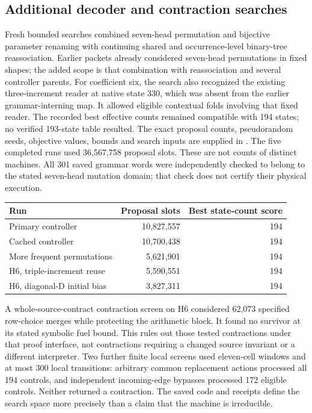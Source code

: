 \subsection{Additional decoder and contraction searches}

Fresh bounded searches combined seven-head permutation and bijective parameter
renaming with continuing shared and occurrence-level binary-tree reassociation.
Earlier packets already considered seven-head permutations in fixed shapes;
the added scope is that combination with reassociation and several controller
parents. For coefficient six, the search also
recognized the existing three-increment reader at native state 330, which
was absent from the earlier grammar-interning map. It allowed eligible
contextual folds involving that fixed reader. The recorded best effective
counts remained compatible with 194 states; no verified 193-state table
resulted. The exact proposal counts, pseudorandom seeds, objective values,
bounds and search inputs are supplied in .
The five completed runs used 36,567,758 proposal slots. These are not counts
of distinct machines. All 301 saved grammar words were independently checked
to belong to the stated seven-head mutation domain; that check does not
certify their physical execution.

\begin{center}\begin{tabular}{lrr}\toprule
Run & Proposal slots & Best state-count score\\\midrule
Primary controller & 10,827,557 & 194\\
Cached controller & 10,700,438 & 194\\
More frequent permutations & 5,621,901 & 194\\
H6, triple-increment reuse & 5,590,551 & 194\\
H6, diagonal-D initial bias & 3,827,311 & 194\\\bottomrule
\end{tabular}\end{center}

A whole-source-contract contraction screen on H6 considered 62,073 specified
row-choice merges while protecting the arithmetic block. It found no survivor
at its stated symbolic fuel bound. This rules out those tested contractions
under that proof interface, not contractions requiring a changed source
invariant or a different interpreter. Two further finite local screens used
eleven-cell windows and at most 300 local transitions: arbitrary common
replacement actions processed all 194 controls, and independent incoming-edge
bypasses processed 172 eligible controls. Neither returned a contraction. The saved code and receipts define the
search space more precisely than a claim that the machine is irreducible.

